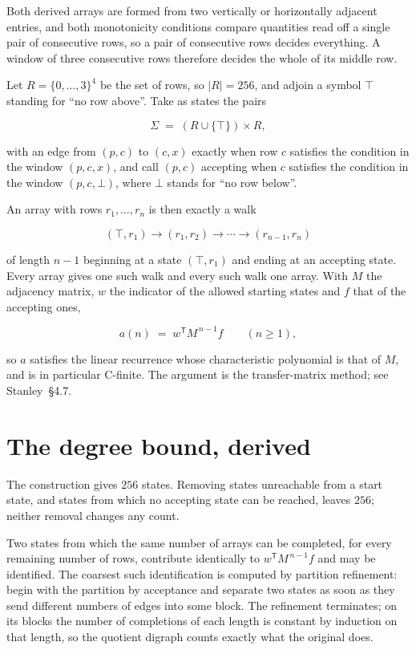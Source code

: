 \documentclass[11pt]{article}
\theoremstyle{definition}
\begin{document}
Both derived arrays are formed from two vertically or horizontally adjacent entries, and both monotonicity conditions compare quantities read off a single pair of consecutive rows, so a pair of consecutive rows decides everything. A window of three consecutive rows therefore decides the whole of its middle row.

Let $R = \{0,\dots,3\}^{4}$ be the set of rows, so $|R| = 256$, and adjoin a symbol $\top$ standing for ``no row above''. Take as states the pairs

\[\Sigma \;=\; (R \cup \{\top\}) \times R,\]

with an edge from $(p,c)$ to $(c,x)$ exactly when row $c$ satisfies the condition in the window $(p,c,x)$, and call $(p,c)$ accepting when $c$ satisfies the condition in the window $(p,c,\bot)$, where $\bot$ stands for ``no row below''.

An array with rows $r_1,\dots,r_n$ is then exactly a walk

\[(\top,r_1) \to (r_1,r_2) \to \cdots \to (r_{n-1},r_n)\]

of length $n-1$ beginning at a state $(\top,r_1)$ and ending at an accepting state. Every array gives one such walk and every such walk one array. With $M$ the adjacency matrix, $w$ the indicator of the allowed starting states and $f$ that of the accepting ones,

\[a(n) \;=\; w^{\mathsf T} M^{\,n-1} f \qquad (n \ge 1),\]

so $a$ satisfies the linear recurrence whose characteristic polynomial is that of $M$, and is in particular C-finite. The argument is the transfer-matrix method; see Stanley~\S4.7.

\section{The degree bound, derived}

The construction gives $256$ states. Removing states unreachable from a start state, and states from which no accepting state can be reached, leaves $256$; neither removal changes any count.

Two states from which the same number of arrays can be completed, for every remaining number of rows, contribute identically to $w^{\mathsf T}M^{\,n-1}f$ and may be identified. The coarsest such identification is computed by partition refinement: begin with the partition by acceptance and separate two states as soon as they send different numbers of edges into some block. The refinement terminates; on its blocks the number of completions of each length is constant by induction on that length, so the quotient digraph counts exactly what the original does.
\end{document}
